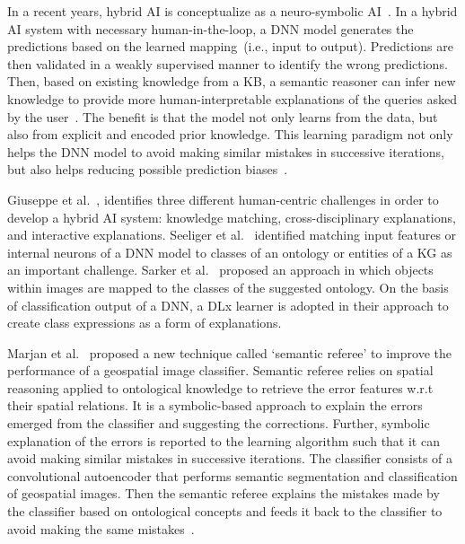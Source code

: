 \hspace*{3.5mm} In a recent years, hybrid AI is conceptualize as a neuro-symbolic AI~\cite{futia2020integration}. In a hybrid AI system with necessary human-in-the-loop, a DNN model generates the predictions based on the learned mapping~(i.e., input to output). Predictions are then validated in a weakly supervised manner to identify the wrong predictions. Then, based on existing knowledge from a KB, a semantic reasoner can infer new knowledge to provide more human-interpretable explanations of the queries asked by the user~\cite{futia2020integration}. The benefit is that the model not only learns from the data, but also from explicit and encoded prior knowledge. This learning paradigm not only helps the DNN model to avoid making similar mistakes in successive iterations, but also helps reducing possible prediction biases~\cite{futia2020integration}. 

\hspace*{3.5mm} Giuseppe et al.~\cite{futia2020integration}, identifies three different human-centric challenges in order to develop a hybrid AI system: knowledge matching, cross-disciplinary explanations, and interactive explanations. Seeliger et al.~\cite{seeliger2019semantic} identified matching input features or internal neurons of a DNN model to classes of an ontology or entities of a KG as an important challenge. Sarker et al.~\cite{sarker2017explaining} proposed an approach in which objects within images are mapped to the classes of the suggested ontology. On the basis of classification output of a DNN, a DLx learner is adopted in their approach to create class expressions as a form of explanations. 

\hspace*{3.5mm} Marjan et al.~\cite{alirezaie2019semantic} proposed a new technique called `semantic referee' to improve the performance of a geospatial image classifier. Semantic referee relies on spatial reasoning applied to ontological knowledge to retrieve the error features w.r.t their spatial relations. It is a symbolic-based approach to explain the errors emerged from the classifier and suggesting the corrections. Further, symbolic explanation of the errors is reported to the learning algorithm such that it can avoid making similar mistakes in successive iterations. The classifier consists of a convolutional autoencoder that performs semantic segmentation and classification of geospatial images. Then the semantic referee explains the mistakes made by the classifier based on ontological concepts and feeds it back to the classifier to avoid making the same mistakes~\cite{alirezaie2019semantic}. %

